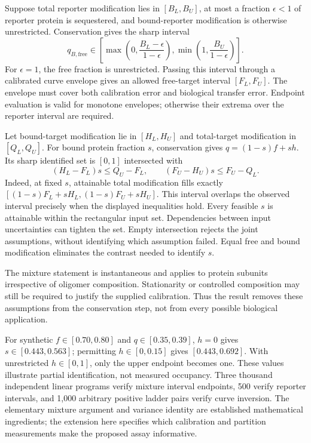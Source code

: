 \documentclass[11pt]{article}
\begin{document}
Suppose total reporter modification lies in $[B_L,B_U]$, at most a fraction $\epsilon<1$ of reporter protein is sequestered, and bound-reporter modification is otherwise unrestricted. Conservation gives the sharp interval
\[
q_{B,\mathrm{free}}\in\left[\max\left(0,\frac{B_L-\epsilon}{1-\epsilon}\right),\min\left(1,\frac{B_U}{1-\epsilon}\right)\right].
\]
For $\epsilon=1$, the free fraction is unrestricted. Passing this interval through a calibrated curve envelope gives an allowed free-target interval $[F_L,F_U]$. The envelope must cover both calibration error and biological transfer error. Endpoint evaluation is valid for monotone envelopes; otherwise their extrema over the reporter interval are required.

Let bound-target modification lie in $[H_L,H_U]$ and total-target modification in $[Q_L,Q_U]$. For bound protein fraction $s$, conservation gives $q=(1-s)f+s h$. Its sharp identified set is $[0,1]$ intersected with
\[
(H_L-F_L)s\leq Q_U-F_L,\qquad
(F_U-H_U)s\leq F_U-Q_L.
\]
Indeed, at fixed $s$, attainable total modification fills exactly $[(1-s)F_L+sH_L,(1-s)F_U+sH_U]$. This interval overlaps the observed interval precisely when the displayed inequalities hold. Every feasible $s$ is attainable within the rectangular input set. Dependencies between input uncertainties can tighten the set. Empty intersection rejects the joint assumptions, without identifying which assumption failed. Equal free and bound modification eliminates the contrast needed to identify $s$.

The mixture statement is instantaneous and applies to protein subunits irrespective of oligomer composition. Stationarity or controlled composition may still be required to justify the supplied calibration. Thus the result removes these assumptions from the conservation step, not from every possible biological application.

For synthetic $f\in[0.70,0.80]$ and $q\in[0.35,0.39]$, $h=0$ gives $s\in[0.443,0.563]$; permitting $h\in[0,0.15]$ gives $[0.443,0.692]$. With unrestricted $h\in[0,1]$, only the upper endpoint becomes one. These values illustrate partial identification, not measured occupancy. Three thousand independent linear programs verify mixture interval endpoints, 500 verify reporter intervals, and 1,000 arbitrary positive ladder pairs verify curve inversion. The elementary mixture argument and variance identity are established mathematical ingredients; the extension here specifies which calibration and partition measurements make the proposed assay informative.
\end{document}

